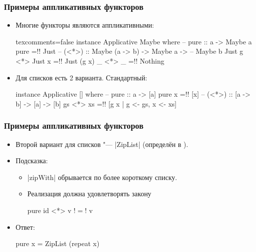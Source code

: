 \documentclass[11pt]{beamer}
\begin{document}
\begin{frame}[fragile]
  \frametitle{Примеры аппликативных функторов}
  \begin{itemize}
    \item Многие функторы являются аппликативными:
          \begin{haskell*}{texcomments=false}
            instance Applicative Maybe where
              -- pure :: a -> Maybe a
              pure =!\pause! Just
              -- (<*>) :: Maybe (a -> b) -> Maybe a ->
              --          Maybe b
              Just g <*> Just x  =!\pause! Just (g x)
              _      <*> _       =!\pause! Nothing
          \end{haskell*}
          \pause
    \item Для списков есть 2 варианта. Стандартный:
          \begin{haskell}
            instance Applicative [] where 
              -- pure :: a -> [a]
              pure x =!\pause! [x]
              -- (<*>) :: [a -> b] -> [a] -> [b]
              gs <*> xs =!\pause! [g x | g <- gs, x <- xs]
          \end{haskell}
  \end{itemize}
\end{frame}

\begin{frame}[fragile]
  \frametitle{Примеры аппликативных функторов}
  \begin{itemize}
    \item Второй вариант для списков "--- \haskinline|ZipList| (определён в \href{https://hackage.haskell.org/package/base/docs/Control-Applicative.html}{}).
          \pause
    \item Подсказка:
          \begin{itemize}
            \item \haskinline|zipWith| обрывается по более короткому списку.
            \item Реализация должна удовлетворять закону
                  \begin{haskell}
                    pure id <*> v !$=$! v
                  \end{haskell}
          \end{itemize}
          \pause
    \item Ответ:
          \begin{haskell}
            pure x = ZipList (repeat x)
          \end{haskell}
  \end{itemize}
\end{frame}
\end{document}
